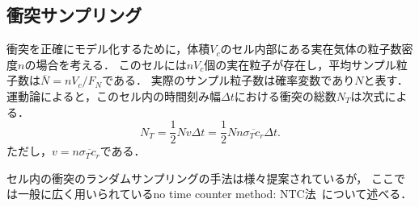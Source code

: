 \subsection{衝突サンプリング}

衝突を正確にモデル化するために，体積$V_c$のセル内部にある実在気体の粒子数密度$n$の場合を考える．
このセルには$nV_c$個の実在粒子が存在し，平均サンプル粒子数は$\overline{N} = nV_c/F_N$である．
実際のサンプル粒子数は確率変数であり$N$と表す．
運動論によると，このセル内の時間刻み幅$\Delta t$における衝突の総数$N_T$は次式による．
\begin{equation}
    N_T = \dfrac{1}{2}Nv\Delta t = \dfrac{1}{2}Nn\overline{\sigma_Tc_r}\Delta t.
    \label{eq:dsmc1.8}
\end{equation}
ただし，$v = n\overline{\sigma_Tc_r}$である．

セル内の衝突のランダムサンプリングの手法は様々提案されているが，
ここでは一般に広く用いられているno time counter method: NTC法~\cite{gallis2008accuracy}について述べる．


